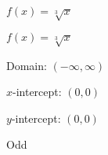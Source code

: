 {$f(x) = \sqrt[3]{x}$}
{$f(x) = \sqrt[3]{x}$ 

Domain: $(-\infty, \infty)$ 

$x$-intercept: $(0, 0)$ 

$y$-intercept: $(0, 0)$ 

Odd

\begin{center}
\end{center}
}